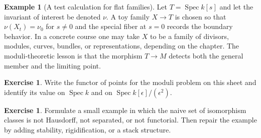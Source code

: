 \documentclass[11pt]{amsart}
\theoremstyle{definition}
\newtheorem{example}[theorem]{Example}
\newtheorem{exercise}[theorem]{Exercise}
\newcommand{\Spec}{\operatorname{Spec}}
\begin{document}
\begin{example}[A test calculation for flat families]
Let $T=\Spec k[s]$ and let the invariant of interest be denoted $\nu$.  A toy family $X\to T$ is chosen so that $\nu(X_t)=\nu_0$ for $s\ne0$ and the special fiber at $s=0$ records the boundary behavior.  In a concrete course one may take $X$ to be a family of divisors, modules, curves, bundles, or representations, depending on the chapter.  The moduli-theoretic lesson is that the morphism $T\to M$ detects both the general member and the limiting point.
\end{example}
\begin{exercise}
Write the functor of points for the moduli problem on this sheet and identify its value on $\Spec k$ and on $\Spec k[\epsilon]/(\epsilon^2)$.
\end{exercise}
\begin{exercise}
Formulate a small example in which the naive set of isomorphism classes is not Hausdorff, not separated, or not functorial.  Then repair the example by adding stability, rigidification, or a stack structure.
\end{exercise}
\clearpage
\end{document}

